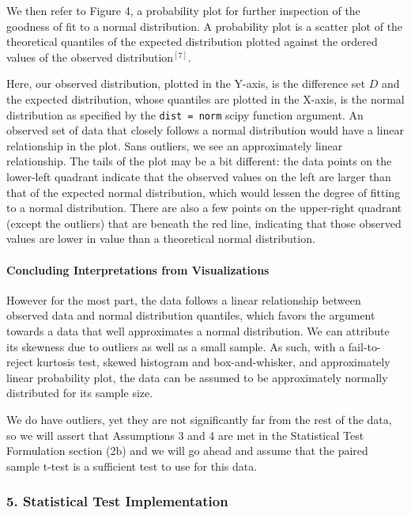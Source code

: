 \documentclass[11pt]{article}
\begin{document}
    We then refer to Figure 4, a probability plot for further inspection of
the goodness of fit to a normal distribution. A probability plot is a
scatter plot of the theoretical quantiles of the expected distribution
plotted against the ordered values of the observed
distribution\(^{[7]}\).

Here, our observed distribution, plotted in the Y-axis, is the
difference set \(D\) and the expected distribution, whose quantiles are
plotted in the X-axis, is the normal distribution as specified by the
\texttt{dist\ =\ norm} scipy function argument. An observed set of data
that closely follows a normal distribution would have a linear
relationship in the plot. Sans outliers, we see an approximately linear
relationship. The tails of the plot may be a bit different: the data
points on the lower-left quadrant indicate that the observed values on
the left are larger than that of the expected normal distribution, which
would lessen the degree of fitting to a normal distribution. There are
also a few points on the upper-right quadrant (except the outliers) that
are beneath the red line, indicating that those observed values are
lower in value than a theoretical normal distribution.

\hypertarget{concluding-interpretations-from-visualizations}{%
\paragraph{Concluding Interpretations from
Visualizations}\label{concluding-interpretations-from-visualizations}}

However for the most part, the data follows a linear relationship
between observed data and normal distribution quantiles, which favors
the argument towards a data that well approximates a normal
distribution. We can attribute its skewness due to outliers as well as a
small sample. As such, with a fail-to-reject kurtosis test, skewed
histogram and box-and-whisker, and approximately linear probability
plot, the data can be assumed to be approximately normally distributed
for its sample size.

We do have outliers, yet they are not significantly far from the rest of
the data, so we will assert that Assumptions 3 and 4 are met in the
Statistical Test Formulation section (2b) and we will go ahead and
assume that the paired sample t-test is a sufficient test to use for
this data.

    \hypertarget{statistical-test-implementation}{%
\subsubsection{5. Statistical Test
Implementation}\label{statistical-test-implementation}}
\end{document}

